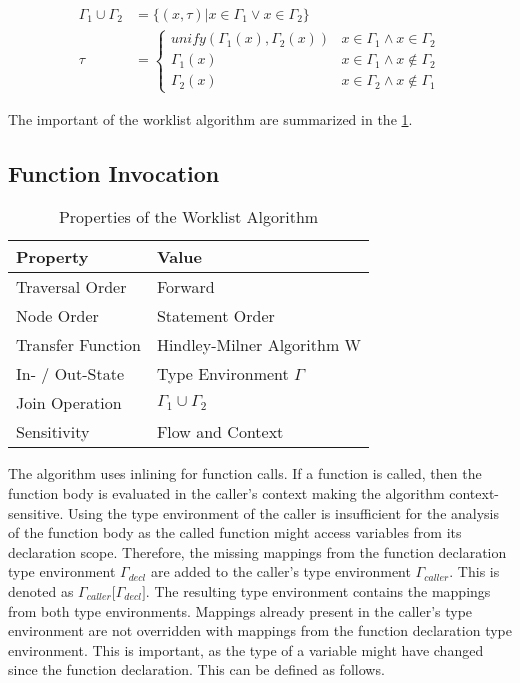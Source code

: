 \begin{align*}
	\Gamma_1 \cup \Gamma_2 &= \lbrace (x, \tau) \vert x \in \Gamma_1 \vee x \in \Gamma_2 \rbrace \\
	\tau &= \begin{cases}
		unify(\Gamma_1(x), \Gamma_2(x)) & x \in \Gamma_1 \wedge x \in \Gamma_2 \\
		\Gamma_1(x) & x \in \Gamma_1 \wedge x \notin \Gamma_2 \\
		\Gamma_2(x) & x \in \Gamma_2\wedge x \notin \Gamma_1
	\end{cases}
\end{align*}

The important of the worklist algorithm are summarized in the \cref{tbl:properties-worklist-algorithm}. 

\subsection{Function Invocation}

\begin{table}
	\centering
	\begin{tabular}{@{}l l@{}}\toprule
	Property & Value \\ \midrule
	Traversal Order & Forward \\
	Node Order & Statement Order \\
	Transfer Function & Hindley-Milner Algorithm W \\
	In- / Out-State & Type Environment $\Gamma$ \\
	Join Operation & $\Gamma_1 \cup \Gamma_2$ \\
	Sensitivity & Flow and Context \\ \bottomrule
	\end{tabular}
	
	\caption{Properties of the Worklist Algorithm}
	\label{tbl:properties-worklist-algorithm}
\end{table}

The algorithm uses inlining for function calls. If a function is called, then the function body is evaluated in the caller's context making the algorithm context-sensitive. Using the type environment of the caller is insufficient for the analysis of the function body as the called function might access variables from its declaration scope. Therefore, the missing mappings from the function declaration type environment $\Gamma_{decl}$ are added to the caller's type environment $\Gamma_{caller}$. This is denoted as $\Gamma_{caller}\Big\lbrack\Gamma_{decl}\Big\rbrack$. The resulting type environment contains the mappings from both type environments. Mappings already present in the caller's type environment are not overridden with mappings from the function declaration type environment. This is important, as the type of a variable might have changed since the function declaration. This can be defined as follows.

